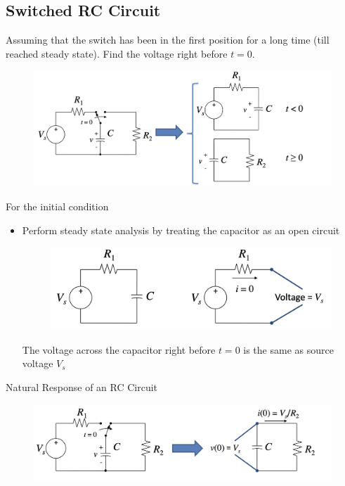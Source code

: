        \subsection{Switched RC Circuit}
            Assuming that the switch has been in the first position for a long time (till reached steady state).
            Find the voltage right before $t=0$.
            \begin{figure}[H]
                \centering
                \includegraphics[width=0.8\linewidth]{chapters/figures/switched_rc.png}
            \end{figure}
            For the initial condition
            \begin{itemize}
                \item Perform steady state analysis by treating the capacitor as an open circuit
                    \begin{figure}[H]
                        \centering
                        \includegraphics[width=0.4\linewidth]{chapters/figures/switched_rc_initial_cond.png}
                    \end{figure}
                    The voltage across the capacitor right before $t=0$ is the same as source voltage $V_s$
            \end{itemize}
            Natural Response of an RC Circuit
            \begin{figure}[H]
                \centering
                \includegraphics[width=0.6\linewidth]{chapters/figures/switched_rc_natural_resp.png}
            \end{figure}
